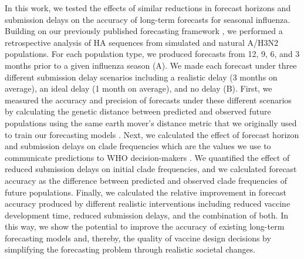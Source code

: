 \documentclass[9pt,lineno]{elife}
\begin{document}
In this work, we tested the effects of similar reductions in forecast horizons and submission delays on the accuracy of long-term forecasts for seasonal influenza.
Building on our previously published forecasting framework \citep{Huddleston2020}, we performed a retrospective analysis of HA sequences from simulated and natural A/H3N2 populations.
For each population type, we produced forecasts from 12, 9, 6, and 3 months prior to a given influenza season (A).
We made each forecast under three different submission delay scenarios including a realistic delay (3 months on average), an ideal delay (1 month on average), and no delay (B).
First, we measured the accuracy and precision of forecasts under these different scenarios by calculating the genetic distance between predicted and observed future populations using the same earth mover's distance metric that we originally used to train our forecasting models \citep{Rubner1998}.
Next, we calculated the effect of forecast horizon and submission delays on clade frequencies which are the values we use to communicate predictions to WHO decision-makers \citep{Huddleston2024}.
We quantified the effect of reduced submission delays on initial clade frequencies, and we calculated forecast accuracy as the difference between predicted and observed clade frequencies of future populations.
Finally, we calculated the relative improvement in forecast accuracy produced by different realistic interventions including reduced vaccine development time, reduced submission delays, and the combination of both.
In this way, we show the potential to improve the accuracy of existing long-term forecasting models and, thereby, the quality of vaccine design decisions by simplifying the forecasting problem through realistic societal changes.

\end{document}

